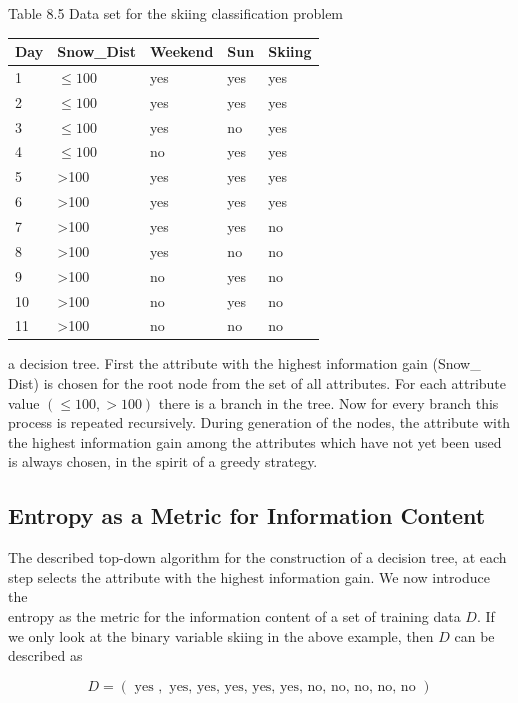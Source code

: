 \documentclass[10pt]{book}
\begin{document}
Table 8.5 Data set for the skiing classification problem

\begin{center}
\begin{tabular}{|l|l|l|l|l|}
\hline
Day & Snow\_Dist & Weekend & Sun & Skiing \\
\hline
1 & $\leq 100$ & yes & yes & yes \\
\hline
2 & $\leq 100$ & yes & yes & yes \\
\hline
3 & $\leq 100$ & yes & no & yes \\
\hline
4 & $\leq 100$ & no & yes & yes \\
\hline
5 & >100 & yes & yes & yes \\
\hline
6 & >100 & yes & yes & yes \\
\hline
7 & >100 & yes & yes & no \\
\hline
8 & >100 & yes & no & no \\
\hline
9 & >100 & no & yes & no \\
\hline
10 & >100 & no & yes & no \\
\hline
11 & >100 & no & no & no \\
\hline
\end{tabular}
\end{center}

a decision tree. First the attribute with the highest information gain (Snow\_ Dist) is chosen for the root node from the set of all attributes. For each attribute value $(\leq 100,>100)$ there is a branch in the tree. Now for every branch this process is repeated recursively. During generation of the nodes, the attribute with the highest information gain among the attributes which have not yet been used is always chosen, in the spirit of a greedy strategy.


\subsection{Entropy as a Metric for Information Content}
The described top-down algorithm for the construction of a decision tree, at each step selects the attribute with the highest information gain. We now introduce the\\
entropy as the metric for the information content of a set of training data $D$. If we only look at the binary variable skiing in the above example, then $D$ can be described as

$$
D=(\text { yes }, \text { yes, yes, yes, yes, yes, no, no, no, no, no })
$$
\end{document}
